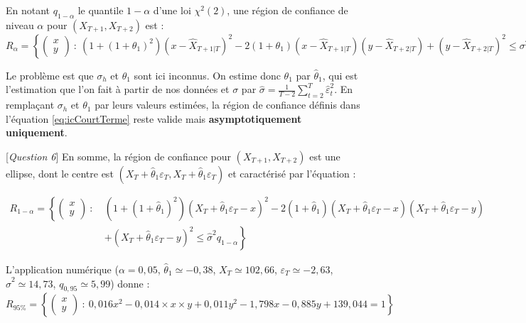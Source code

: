 \documentclass[,french]{article}
\begin{document}
En notant \(q_{1- \alpha}\) le quantile \(1- \alpha\) d'une loi \({\chi}^2(2)\), une région de confiance de niveau \(\alpha\) pour \((X_{T+1},X_{T+2})\) est :
\begin{equation}
R_\alpha=\left\{ 
\begin{pmatrix}
    x \\ y
\end{pmatrix}\: :\:
(1+(1+\theta_1)^2)(x-\widehat X_{T+1\vert T})^2-2(1+\theta_1)(x-\widehat X_{T+1\vert T})(y-\widehat X_{T+2\vert T}) + (y-\widehat X_{T+2\vert T})^2\leq \sigma^2q_{1-\alpha} 
\right\}
\label{eq:icCourtTerme}
\end{equation}

Le problème est que \(\sigma_h\) et \(\theta_1\) sont ici inconnus.
On estime donc \(\theta_1\) par \(\widehat \theta_1\), qui est l'estimation que l'on fait à partir de nos données et \(\sigma\) par \(\widehat \sigma= \frac{1}{T-2}\sum_{t=2}^T\widehat\varepsilon_t^2\).
En remplaçant \(\sigma_h\) et \(\theta_1\) par leurs valeurs estimées, la région de confiance définis dans l'équation \eqref{eq:icCourtTerme} reste valide mais \textbf{asymptotiquement uniquement}.

{[}\emph{Question 6}{]} En somme, la région de confiance pour \((X_{T+1},X_{T+2})\) est une ellipse, dont le centre est \((X_T + \widehat\theta_1\varepsilon_T, X_T + \widehat\theta_1\varepsilon_T)\) et caractérisé par l'équation :

\begin{equation}
\begin{split}
R_{1-\alpha}=\left\{ 
\begin{pmatrix}
    x \\ y
\end{pmatrix}\: :\:\right.
&(1+(1+\widehat\theta_1)^2)( X_T + \widehat\theta_1\varepsilon_T-x)^2
-
2(1+\widehat\theta_1)(X_T + \widehat\theta_1\varepsilon_T-x)(X_T + \widehat\theta_1\varepsilon_T-y) \\
&+
(X_T + \widehat\theta_1\varepsilon_T-y)^2\leq \widehat\sigma^2q_{1-\alpha} 
\left.\right\}
\end{split}
\label{eq:icPrev}
\end{equation}

L'application numérique (\(\alpha = 0,05\), \(\widehat\theta_1\simeq -0,38\), \(X_T\simeq102,66\), \(\varepsilon_T\simeq-2,63\), \(\hat \sigma^2 \simeq 14,73\), \(q_{0,95} \simeq 5,99\)) donne :
\begin{equation}
R_{95\%}=\left\{ 
\begin{pmatrix}
    x \\ y
\end{pmatrix}\: :\:
0,016 x^2 - 0,014 \times x \times y + 0,011 y^2 - 1,798 x - 0,885 y + 139,044 = 1
\right\}
\label{eq:icApplique}
\end{equation}
\end{document}
